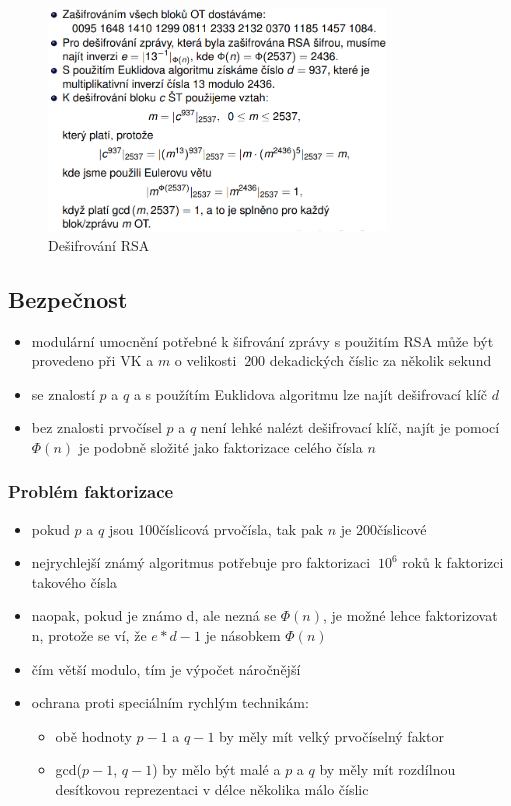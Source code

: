\documentclass{szzclass}
\begin{document}
\begin{figure}[h!]
    \centering
    \includegraphics[width=0.8\textwidth]{topics/bi-spol-06/image/rsaDecrypt.png}
    \caption{Dešifrování RSA}
\end{figure}
\subsection{Bezpečnost}
\begin{itemize}
    \item modulární umocnění potřebné k šifrování zprávy s použitím RSA může být provedeno při VK a $m$ o velikosti $~200$ dekadických číslic za několik sekund
    \item se znalostí $p$ a $q$ a s použítím Euklidova algoritmu lze najít dešifrovací klíč $d$
    \item bez znalosti prvočísel $p$ a $q$ není lehké nalézt dešifrovací klíč, najít je pomocí $\Phi(n)$ je podobně složité jako faktorizace celého čísla $n$
\end{itemize}
\subsubsection{Problém faktorizace}
\begin{itemize}
    \item pokud $p$ a $q$ jsou 100číslicová prvočísla, tak pak $n$ je 200číslicové
    \item nejrychlejší známý algoritmus potřebuje pro faktorizaci $~10^6$ roků k faktorizci takového čísla
    \item naopak, pokud je známo d, ale nezná se $\Phi(n)$, je možné lehce faktorizovat n, protože se ví, že $e*d - 1$ je násobkem $\Phi(n)$
    \item čím větší modulo, tím je výpočet náročnější
    \item ochrana proti speciálním rychlým technikám:
    \begin{itemize}
        \item obě hodnoty $p-1$ a $q-1$ by měly mít velký prvočíselný faktor
        \item gcd($p-1$, $q-1$) by mělo být malé a $p$ a $q$ by měly mít rozdílnou desítkovou reprezentaci v délce několika málo číslic
    \end{itemize}
\end{itemize}
\end{document}
